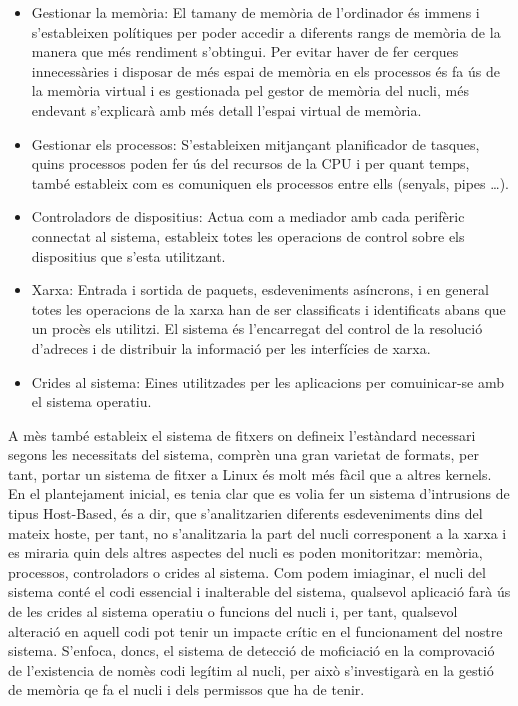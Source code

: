 ﻿\documentclass[10pt,a4paper,twocolumn,twoside]{article}
\begin{document}
\begin{itemize}
\item Gestionar la memòria: El tamany de memòria de l’ordinador és immens i s’estableixen polítiques per poder accedir a diferents rangs de memòria de la manera que més rendiment s’obtingui. Per evitar haver de fer cerques innecessàries i disposar de més espai de memòria en els processos és fa ús de la memòria virtual i es gestionada pel gestor de memòria del nucli, més endevant s’explicarà amb més detall l’espai virtual de memòria. 
\item Gestionar els processos: S’estableixen mitjançant planificador de tasques, quins processos poden fer ús del recursos de la CPU i per quant temps, també estableix com es comuniquen els processos entre ells (senyals, pipes …).
\item Controladors de dispositius: Actua com a mediador amb cada perifèric connectat al sistema, estableix totes les operacions de control sobre els dispositius que s’esta utilitzant.
\item Xarxa: Entrada i sortida de paquets, esdeveniments asíncrons, i en general totes les operacions de la xarxa han de ser classificats i identificats abans que un procès els utilitzi. El sistema és l’encarregat del control de la resolució d’adreces i de distribuir la informació per les interfícies de xarxa.
\item Crides al sistema: Eines utilitzades per les aplicacions per comuinicar-se amb el sistema operatiu.

\end{itemize}
A mès també estableix el sistema de fitxers on defineix l’estàndard necessari segons les necessitats del sistema, comprèn una gran varietat de formats, per tant, portar un sistema de fitxer a Linux és molt més fàcil que a altres kernels.
En el plantejament inicial, es tenia clar que es volia fer un sistema d’intrusions de tipus Host-Based, és a dir, que s’analitzarien diferents esdeveniments dins del mateix hoste, per tant, no s’analitzaria la part del nucli corresponent a la xarxa i es miraria quin dels altres aspectes del nucli es poden monitoritzar: memòria, processos, controladors o crides al sistema.
Com podem imiaginar, el nucli del sistema conté el codi essencial i inalterable del sistema, qualsevol aplicació farà ús de les crides al sistema operatiu o funcions del nucli i, per tant, qualsevol alteració en aquell codi pot tenir un impacte crític en el funcionament del nostre sistema. S’enfoca, doncs, el sistema de detecció de moficiació en la comprovació de l’existencia de nomès codi legítim al nucli, per això s’investigarà en la gestió de memòria qe fa el nucli i dels permissos que ha de tenir.
\end{document}
